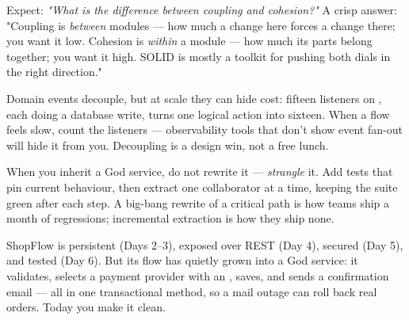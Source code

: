 \begin{interview}
Expect: \emph{"What is the difference between coupling and cohesion?"} A crisp answer: "Coupling is \emph{between} modules --- how much a change here forces a change there; you want it low. Cohesion is \emph{within} a module --- how much its parts belong together; you want it high. SOLID is mostly a toolkit for pushing both dials in the right direction."
\end{interview}

\begin{perfnote}
Domain events decouple, but at scale they can hide cost: fifteen listeners on , each doing a database write, turns one logical action into sixteen. When a flow feels slow, count the listeners --- observability tools that don't show event fan-out will hide it from you. Decoupling is a design win, not a free lunch.
\end{perfnote}

\begin{prodtip}
When you inherit a God service, do not rewrite it --- \emph{strangle} it. Add tests that pin current behaviour, then extract one collaborator at a time, keeping the suite green after each step. A big-bang rewrite of a critical path is how teams ship a month of regressions; incremental extraction is how they ship none.
\end{prodtip}


ShopFlow is persistent (Days 2--3), exposed over REST (Day 4), secured (Day 5), and tested (Day 6). But its  flow has quietly grown into a God service: it validates, selects a payment provider with an , saves, and sends a confirmation email --- all in one transactional method, so a mail outage can roll back real orders. Today you make it clean.

